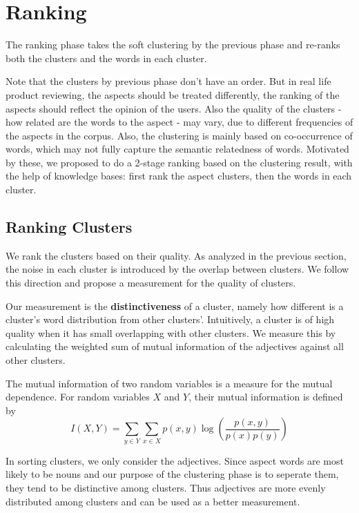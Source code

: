 \section{Ranking}

The ranking phase takes the soft clustering by the previous phase and re-ranks both the clusters and the words in each cluster.

Note that the clusters by previous phase don't have an order. But in real life product reviewing, the aspects should be treated differently, the ranking of the aspects should reflect the opinion of the users. Also the quality of the clusters - how related are the words to the aspect - may vary, due to different frequencies of the aspects in the corpus. Also, the clustering is mainly based on co-occurrence of words, which may not fully capture the semantic relatedness of words. Motivated by these, we proposed to do a 2-stage ranking based on the clustering result, with the help of knowledge bases: first rank the aspect clusters, then the words in each cluster.

\subsection{Ranking Clusters}

We rank the clusters based on their quality. As analyzed in the previous section, the noise in each cluster is introduced by the overlap between clusters. We follow this direction and propose a measurement for the quality of clusters.

Our measurement is the \textbf{distinctiveness} of a cluster, namely how different is a cluster's word distribution from other clusters'. Intuitively, a cluster is of high quality when it has small overlapping with other clusters. We measure this by calculating the weighted sum of mutual information of the adjectives against all other clusters.

The mutual information of two random variables is a measure for the mutual dependence. For random variables $X$ and $Y$, their mutual information is defined by 
$$I(X, Y) = \sum_{y\in Y} \sum_{x\in X} p(x, y) \log\left(\frac{p(x, y)}{p(x)p(y)}\right)$$

In sorting clusters, we only consider the adjectives. Since aspect words are most likely to be nouns and our purpose of the clustering phase is to seperate them, they tend to be distinctive among clusters. Thus adjectives are more evenly distributed among clusters and can be used as a better measurement.

